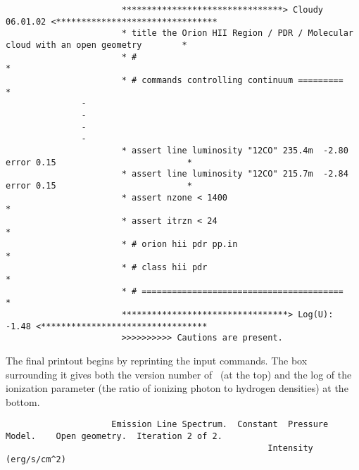 {\setverbatimfontsize{\tiny}
\begin{verbatim}
                       ********************************> Cloudy 06.01.02 <********************************
                       * title the Orion HII Region / PDR / Molecular cloud with an open geometry        *
                       * #                                                                               *
                       * # commands controlling continuum =========                                      *
               -
               -
               -
               -
                       * assert line luminosity "12CO" 235.4m  -2.80 error 0.15                          *
                       * assert line luminosity "12CO" 215.7m  -2.84 error 0.15                          *
                       * assert nzone < 1400                                                             *
                       * assert itrzn < 24                                                               *
                       * # orion hii pdr pp.in                                                           *
                       * # class hii pdr                                                                 *
                       * # ========================================                                      *
                       *********************************> Log(U): -1.48 <*********************************
                       >>>>>>>>>> Cautions are present.
\end{verbatim}
}

The final printout begins by reprinting the input commands.
The box
surrounding it gives both the version number of \Cloudy\ (at the top) and
the log of the ionization parameter (the ratio of ionizing photon
to hydrogen densities) at the bottom.
{\setverbatimfontsize{\tiny}
\begin{verbatim}
                     Emission Line Spectrum.  Constant  Pressure Model.    Open geometry.  Iteration 2 of 2.
                                                    Intensity (erg/s/cm^2)
\end{verbatim}
}

